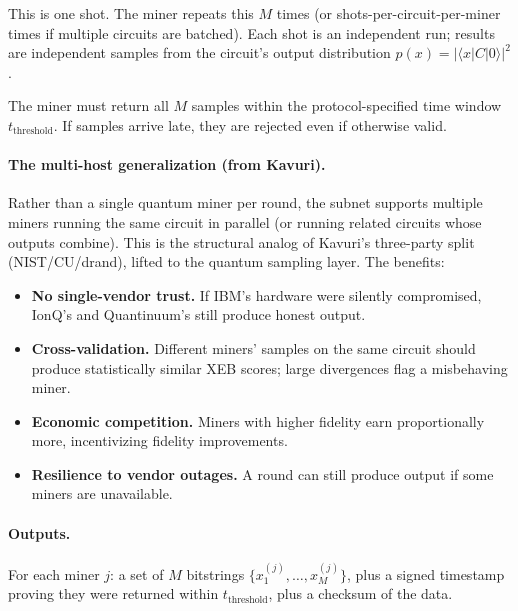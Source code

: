 \documentclass[11pt]{article}
\begin{document}
This is one shot. The miner repeats this $M$ times (or shots-per-circuit-per-miner times if multiple circuits are batched). Each shot is an independent run; results are independent samples from the circuit's output distribution $p(x) = |\langle x | C | 0 \rangle|^2$.

The miner must return all $M$ samples within the protocol-specified time window $t_{\text{threshold}}$. If samples arrive late, they are rejected even if otherwise valid.

\paragraph{The multi-host generalization (from Kavuri).} Rather than a single quantum miner per round, the subnet supports multiple miners running the same circuit in parallel (or running related circuits whose outputs combine). This is the structural analog of Kavuri's three-party split (NIST/CU/drand), lifted to the quantum sampling layer. The benefits:

\begin{itemize}
    \item \textbf{No single-vendor trust.} If IBM's hardware were silently compromised, IonQ's and Quantinuum's still produce honest output.
    \item \textbf{Cross-validation.} Different miners' samples on the same circuit should produce statistically similar XEB scores; large divergences flag a misbehaving miner.
    \item \textbf{Economic competition.} Miners with higher fidelity earn proportionally more, incentivizing fidelity improvements.
    \item \textbf{Resilience to vendor outages.} A round can still produce output if some miners are unavailable.
\end{itemize}

\paragraph{Outputs.} For each miner $j$: a set of $M$ bitstrings $\{x_1^{(j)}, \ldots, x_M^{(j)}\}$, plus a signed timestamp proving they were returned within $t_{\text{threshold}}$, plus a checksum of the data.
\end{document}
